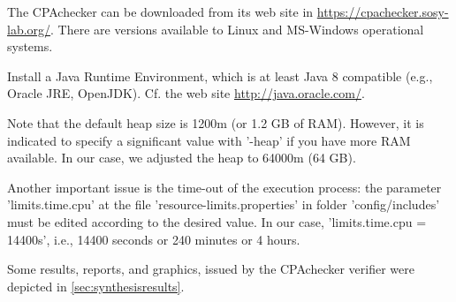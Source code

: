 The CPAchecker can be downloaded from its web site in \url{https://cpachecker.sosy-lab.org/}. There are versions available to Linux and MS-Windows operational systems.

Install a Java Runtime Environment, which is at least Java 8 compatible (e.g., Oracle JRE, OpenJDK). Cf. the web site \url{http://java.oracle.com/}.

\bigskip
{} 
\bigskip

Note that the default heap size is 1200m (or 1.2 GB of RAM). However, it is indicated to specify a significant value with '-heap' if you have more RAM available. In our case, we adjusted the heap to 64000m (64 GB). 

Another important issue is the time-out of the execution process: the parameter 'limits.time.cpu' at the file 'resource-limits.properties' in folder 'config/includes' must be edited according to the desired value. In our case, 'limits.time.cpu = 14400s', i.e., 14400 seconds or 240 minutes or 4 hours.

Some results, reports, and graphics, issued by the CPAchecker verifier were depicted in \ref{sec:synthesisresults}.

